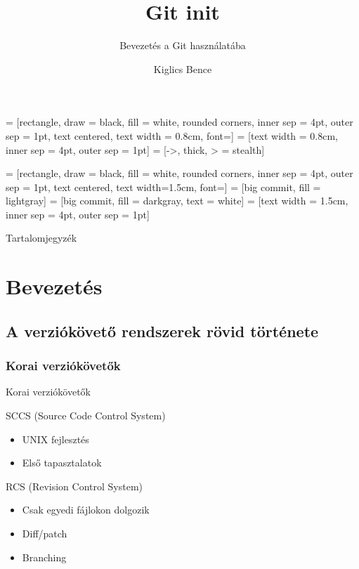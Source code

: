 \documentclass[display,t]{beamer}
\title{Git init}
\subtitle{Bevezetés a Git használatába}
\author{Kiglics Bence}
\begin{document}
 = [rectangle, draw = black, fill = white, rounded corners,
                      inner sep = 4pt, outer sep = 1pt, text centered,
                      text width = 0.8cm, font=\small]
 = [text width = 0.8cm, inner sep = 4pt, outer sep = 1pt]
 = [->, thick, > = stealth]

 = [rectangle, draw = black, fill = white, rounded corners,
                          inner sep = 4pt, outer sep = 1pt, text centered,
                          text width=1.5cm, font=\small]
     = [big commit, fill = lightgray]
        = [big commit, fill = darkgray, text = white]
 = [text width = 1.5cm, inner sep = 4pt, outer sep = 1pt]


\frame{\titlepage}

\begin{frame}{Tartalomjegyzék}
    \tableofcontents
\end{frame}

\section{Bevezetés}
\subsection{A verziókövető rendszerek rövid története}
\subsubsection{Korai verziókövetők}

\begin{frame}{Korai verziókövetők}
    \pause
    \begin{block}{SCCS (Source Code Control System)}
        \begin{itemize}
            \pause \item UNIX fejlesztés
            \pause \item Első tapasztalatok
        \end{itemize}
    \end{block}
    \pause
    \begin{block}{RCS (Revision Control System)}
        \begin{itemize}
            \pause \item Csak egyedi fájlokon dolgozik
            \pause \item Diff/patch
            \pause \item Branching
        \end{itemize}
    \end{block}
\end{frame}
\end{document}
